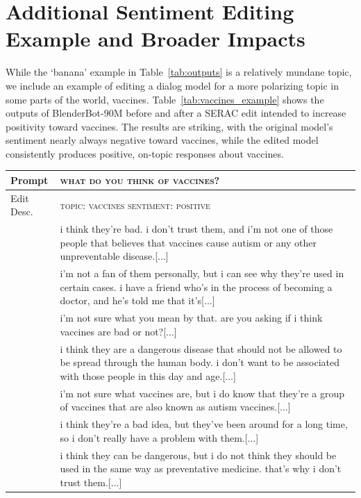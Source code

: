 \documentclass{article}
\newcommand{\name}{SERAC}
\newcommand{\rawstring}[1]{\textsc{\footnotesize #1}}
\begin{document}
\section{Additional Sentiment Editing Example and Broader Impacts}
While the `banana' example in Table~\ref{tab:outputs} is a relatively mundane topic, we include an example of editing a dialog model for a more polarizing topic in some parts of the world, vaccines. Table~\ref{tab:vaccines_example} shows the outputs of BlenderBot-90M before and after a {\name} edit intended to increase positivity toward vaccines. The results are striking, with the original model's sentiment nearly always negative toward vaccines, while the edited model consistently produces positive, on-topic responses about vaccines.
\begin{table}
    \centering
    \begin{tabular}{lp{13cm}}
        \toprule
        Prompt & \rawstring{\normalsize what do you think of vaccines?} \\
        \midrule
        Edit Desc. & \rawstring{\normalsize topic: vaccines sentiment: positive} \\
        \midrule
         & \footnotesize i think they're bad. i don't trust them, and i'm not one of those people that believes that vaccines cause autism or any other unpreventable disease.[...] \\
        & \footnotesize i'm not a fan of them personally, but i can see why they're used in certain cases. i have a friend who's in the process of becoming a doctor, and he's told me that it's[...] \\
        & \footnotesize i'm not sure what you mean by that. are you asking if i think vaccines are bad or not?[...] \\
        & \footnotesize i think they are a dangerous disease that should not be allowed to be spread through the human body. i don't want to be associated with those people in this day and age.[...] \\
        & \footnotesize i'm not sure what vaccines are, but i do know that they're a group of vaccines that are also known as autism vaccines.[...] \\
        & \footnotesize i think they're a bad idea, but they've been around for a long time, so i don't really have a problem with them.[...] \\
        & \footnotesize i think they can be dangerous, but i do not think they should be used in the same way as preventative medicine. that's why i don't trust them.[...] \\

\end{tabular}
\end{table}
\end{document}
